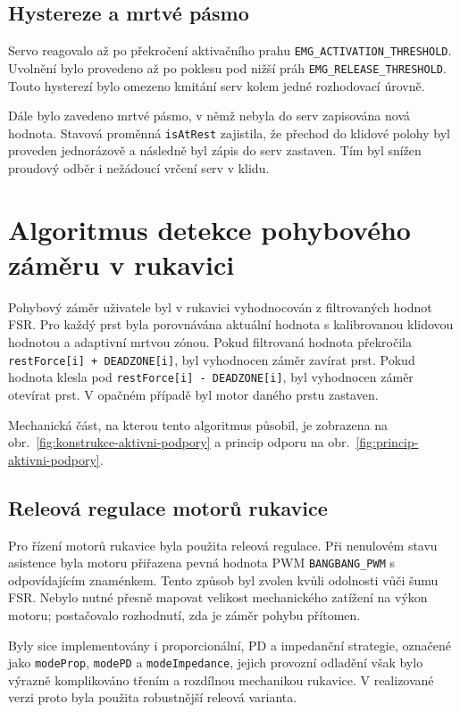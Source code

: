 \documentclass[FZS,DP]{tulthesis}
\begin{document}
\subsection{Hystereze a mrtvé pásmo}
\label{subsec:hystereze-semgg}

Servo reagovalo až po překročení aktivačního prahu \texttt{EMG\_ACTIVATION\_THRESHOLD}. Uvolnění bylo provedeno až po poklesu pod nižší práh \texttt{EMG\_RELEASE\_THRESHOLD}. Touto hysterezí bylo omezeno kmitání serv kolem jedné rozhodovací úrovně.

Dále bylo zavedeno mrtvé pásmo, v němž nebyla do serv zapisována nová hodnota. Stavová proměnná \texttt{isAtRest} zajistila, že přechod do klidové polohy byl proveden jednorázově a následně byl zápis do serv zastaven. Tím byl snížen proudový odběr i nežádoucí vrčení serv v klidu.

\section{Algoritmus detekce pohybového záměru v rukavici}
\label{sec:algoritmus-zameru}

Pohybový záměr uživatele byl v rukavici vyhodnocován z filtrovaných hodnot FSR. Pro každý prst byla porovnávána aktuální hodnota s kalibrovanou klidovou hodnotou a adaptivní mrtvou zónou. Pokud filtrovaná hodnota překročila \texttt{restForce[i] + DEADZONE[i]}, byl vyhodnocen záměr zavírat prst. Pokud hodnota klesla pod \texttt{restForce[i] - DEADZONE[i]}, byl vyhodnocen záměr otevírat prst. V opačném případě byl motor daného prstu zastaven.

Mechanická část, na kterou tento algoritmus působil, je zobrazena na obr.~\ref{fig:konstrukce-aktivni-podpory} a princip odporu na obr.~\ref{fig:princip-aktivni-podpory}.

\subsection{Releová regulace motorů rukavice}
\label{subsec:releova-regulace}

Pro řízení motorů rukavice byla použita releová regulace. Při nenulovém stavu asistence byla motoru přiřazena pevná hodnota PWM \texttt{BANGBANG\_PWM} s odpovídajícím znaménkem. Tento způsob byl zvolen kvůli odolnosti vůči šumu FSR. Nebylo nutné přesně mapovat velikost mechanického zatížení na výkon motoru; postačovalo rozhodnutí, zda je záměr pohybu přítomen.

Byly sice implementovány i proporcionální, PD a impedanční strategie, označené jako \texttt{modeProp}, \texttt{modePD} a \texttt{modeImpedance}, jejich provozní odladění však bylo výrazně komplikováno třením a rozdílnou mechanikou rukavice. V realizované verzi proto byla použita robustnější releová varianta.
\end{document}
